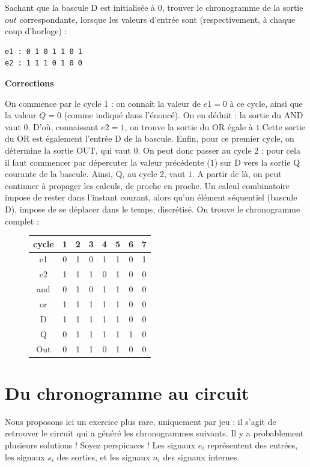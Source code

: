 \documentclass[a4paper,11pt]{article}
\begin{document}
Sachant que la bascule D est initialisée à 0, trouver le chronogramme de la sortie $out$ correspondante, lorsque les valeurs d'entrée sont (respectivement, à chaque coup d'horloge) :

\begin{verbatim}
e1 : 0 1 0 1 1 0 1
e2 : 1 1 1 0 1 0 0
\end{verbatim}

{\bf Corrections}

On commence par le cycle 1 : on connaît la valeur de $e1=0$ à ce cycle, ainsi que la valeur $Q=0$ (comme indiqué dans l'énoncé).
On en déduit : la sortie du AND vaut $0$. D'où, connaissant $e2=1$, on
trouve la sortie du OR égale à $1$.Cette sortie du OR est également l'entrée D de la bascule.
Enfin, pour ce premier cycle, on détermine la sortie OUT, qui vaut $0$. On peut donc passer
au cycle 2 : pour cela il faut commencer par dépercuter la valeur précédente ($1$) sur D vers la sortie Q courante de la bascule. Ainsi, Q, au cycle 2, vaut $1$.
A partir de là, on peut continuer à propager les calculs, de proche en proche.
Un calcul combinatoire impose de rester dans l'instant courant, alors qu'un élément séquentiel (bascule D), impose de se déplacer dans le temps, discrétisé.
On trouve le chronogramme complet :

\begin{figure}
\begin{center}
      \begin{tabular}{|c||c|c|c|c|c|c|c|}
          \hline
          cycle  & 1 & 2 & 3 & 4 & 5 & 6 & 7 \\ \hline \hline
          e1     & 0 & 1 & 0 & 1 & 1 & 0 & 1   \\ \hline
          e2     & 1 & 1 & 1 & 0 & 1 & 0 & 0  \\ \hline
          and    & 0 & 1 & 0 & 1 & 1 & 0 & 0   \\ \hline
          or     & 1 & 1 & 1 & 1 & 1 & 0 & 0   \\ \hline
          D      & 1 & 1 & 1 & 1 & 1 & 0 & 0   \\ \hline
          Q      & 0 & 1 & 1 & 1 & 1 & 1 & 0   \\ \hline
          Out    & 0 & 1 & 1 & 0 & 1 & 0 & 0   \\ \hline
      \end{tabular}
\end{center}
\end{figure}
\newpage
\section{Du chronogramme au circuit}
Nous proposons ici un exercice plus rare, uniquement par jeu : il s'agit de retrouver le circuit qui a généré les chronogrammes suivants.
Il y a probablement plusieurs solutions ! Soyez perspicaces ! Les signaux $e_i$ représentent des entrées, les signaux $s_i$ des sorties, et les signaux $n_i$ des signaux internes.
\end{document}
